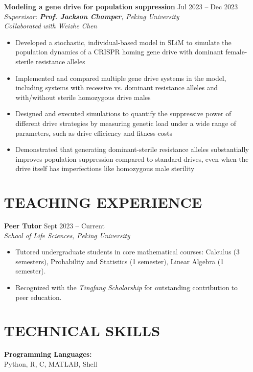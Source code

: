 \documentclass[a4paper,10pt]{extarticle}
\begin{document}
\vspace{0.5\baselineskip}

\noindent
\textbf{Modeling a gene drive for population suppression} \hfill Jul 2023 -- Dec 2023 \\
\textit{Supervisor: \textbf{Prof. Jackson Champer}, Peking University} \\
\textit{Collaborated with Weizhe Chen}
\begin{itemize}
\item Developed a stochastic, individual-based model in SLiM to simulate the population dynamics of a CRISPR homing gene drive with dominant female-sterile resistance alleles
\item Implemented and compared multiple gene drive systems in the model, including systems with recessive vs. dominant resistance alleles and with/without sterile homozygous drive males
\item Designed and executed simulations to quantify the suppressive power of different drive strategies by measuring genetic load under a wide range of parameters, such as drive efficiency and fitness costs
\item Demonstrated that generating dominant-sterile resistance alleles substantially improves population suppression compared to standard drives, even when the drive itself has imperfections like homozygous male sterility
\end{itemize}

\section*{TEACHING EXPERIENCE}
\noindent
\textbf{Peer Tutor} \hfill Sept 2023 -- Current \\
\textit{School of Life Sciences, Peking University}
\begin{itemize}
    \item Tutored undergraduate students in core mathematical courses: Calculus (3 semesters), Probability and Statistics (1 semester), Linear Algebra (1 semester).
    \item Recognized with the \textit{Tingfang Scholarship} for outstanding contribution to peer education.
\end{itemize}

\section*{TECHNICAL SKILLS}
\noindent
\textbf{Programming Languages:} \\
Python, R, C, MATLAB, Shell 
\end{document}
